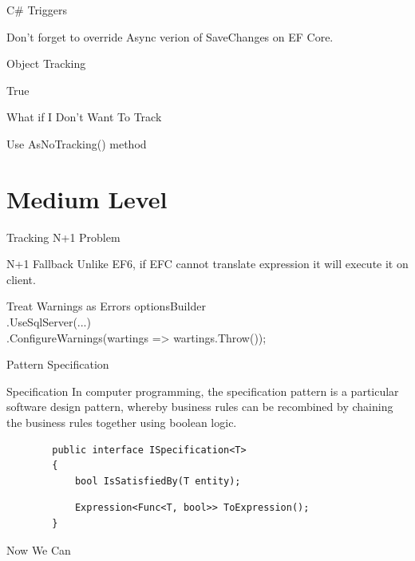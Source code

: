 \documentclass{bredelebeamer}
\begin{document}
\begin{frame}{C\# Triggers}
    
    \pause
    Don't forget to override Async verion of SaveChanges on EF Core.

\end{frame}
\begin{frame}{Object Tracking}
    
    \pause
    \begin{exampleblock}{}
        True
    \end{exampleblock}
\end{frame}

\begin{frame}{What if I Don't Want To Track}
    \begin{exampleblock}{}
        Use AsNoTracking() method
    \end{exampleblock}{}
\end{frame}

\section{Medium Level}
\begin{frame}{Tracking N+1 Problem}
    \begin{alertblock}{N+1 Fallback}
        Unlike EF6, if EFC cannot translate expression it will execute it on client.
    \end{alertblock}
    \pause
    \begin{exampleblock}{Treat Warnings as Errors}
        optionsBuilder\\
                .UseSqlServer(...)\\
                .ConfigureWarnings(wartings => wartings.Throw());
    \end{exampleblock}
\end{frame}

\begin{frame}[fragile]{Pattern Specification}
    \begin{exampleblock}{Specification}
        In computer programming, the specification pattern is a particular software design pattern, whereby business rules can be recombined by chaining the business rules together using boolean logic. 
    \end{exampleblock}
    \pause
    \begin{lstlisting}
        public interface ISpecification<T>
        {
            bool IsSatisfiedBy(T entity);
    \end{lstlisting}
    \pause
    \begin{lstlisting}
            Expression<Func<T, bool>> ToExpression();
        }
    \end{lstlisting}
\end{frame}
\begin{frame}[fragile]{Now We Can}
    
\end{frame}
\end{document}

